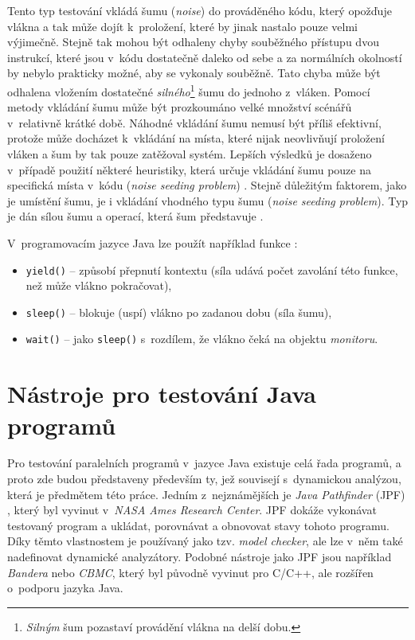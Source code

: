 Tento typ testování vkládá šumu (\textit{noise}) \cite{cite:sum} do prováděného kódu, který opožďuje vlákna a tak může dojít k~proložení, které by jinak nastalo pouze velmi výjimečně. Stejně tak mohou být odhaleny chyby souběžného přístupu dvou instrukcí, které jsou v~kódu dostatečně daleko od sebe a za normálních okolností by nebylo prakticky možné, aby se vykonaly souběžně. Tato chyba může být odhalena vložením dostatečné \textit{silného}\footnote{\textit{Silným} šum pozastaví provádění vlákna na delší dobu.} šumu do jednoho z~vláken. Pomocí metody vkládání šumu může být prozkoumáno velké množství scénářů v~relativně krátké době. Náhodné vkládání šumu nemusí být příliš efektivní, protože může docházet k~vkládání na místa, které nijak neovlivňují proložení vláken a šum by tak pouze zatěžoval systém. Lepších výsledků je dosaženo v~případě použití některé heuristiky, která určuje vkládání šumu pouze na specifická místa v~kódu (\textit{noise seeding problem}) \cite{cite:advances}. Stejně důležitým faktorem, jako je umístění šumu, je i vkládání vhodného typu šumu (\textit{noise seeding problem}). Typ je dán sílou šumu a operací, která šum představuje \cite{cite:advances}.

V~programovacím jazyce Java lze použít například funkce \cite{cite:javad}:
\begin{itemize}
\item \texttt{yield()} -- způsobí přepnutí kontextu (síla udává počet zavolání této funkce, než může vlákno pokračovat),
\item \texttt{sleep()} -- blokuje (uspí) vlákno po zadanou dobu (síla šumu),
\item \texttt{wait()} -- jako \texttt{sleep()} s~rozdílem, že vlákno čeká na objektu \textit{monitoru}.
\end{itemize}

\section{Nástroje pro testování Java programů}

Pro testování paralelních programů v~jazyce Java existuje celá řada programů, a proto zde budou představeny především ty, jež souvisejí s~dynamickou analýzou, která je předmětem této práce. Jedním z~nejznámějších je \textit{Java Pathfinder} (JPF) \cite{cite:jpf}, který byl vyvinut v~\textit{NASA Ames Research Center}. JPF dokáže vykonávat testovaný program a ukládat, porovnávat a obnovovat stavy tohoto programu. Díky těmto vlastnostem je používaný jako tzv. \textit{model checker}, ale lze v~něm také nadefinovat dynamické analyzátory. Podobné nástroje jako JPF jsou například \textit{Bandera} nebo \textit{CBMC}, který byl původně vyvinut pro C/C++, ale rozšířen o~podporu jazyka Java.

